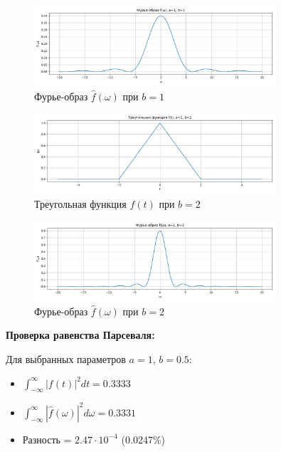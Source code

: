 \begin{figure}[H]
    \centering
    \includegraphics[width=0.8\textwidth]{python/triangle_fourier_b1.png}
    \caption{Фурье-образ $\hat{f}(\omega)$ при $b = 1$}
\end{figure}

\begin{figure}[H]
    \centering
    \includegraphics[width=0.8\textwidth]{python/triangle_function_b2.png}
    \caption{Треугольная функция $f(t)$ при $b = 2$}
\end{figure}

\begin{figure}[H]
    \centering
    \includegraphics[width=0.8\textwidth]{python/triangle_fourier_b2.png}
    \caption{Фурье-образ $\hat{f}(\omega)$ при $b = 2$}
\end{figure}

\textbf{Проверка равенства Парсеваля:}

Для выбранных параметров $a = 1$, $b = 0.5$:
\begin{itemize}
    \item $\displaystyle \int_{-\infty}^{\infty} |f(t)|^2 dt = 0.3333$
    \item $\displaystyle \int_{-\infty}^{\infty} |\hat{f}(\omega)|^2 d\omega = 0.3331$
    \item Разность = $2.47 \cdot 10^{-4}$ (0.0247\%)
\end{itemize}

